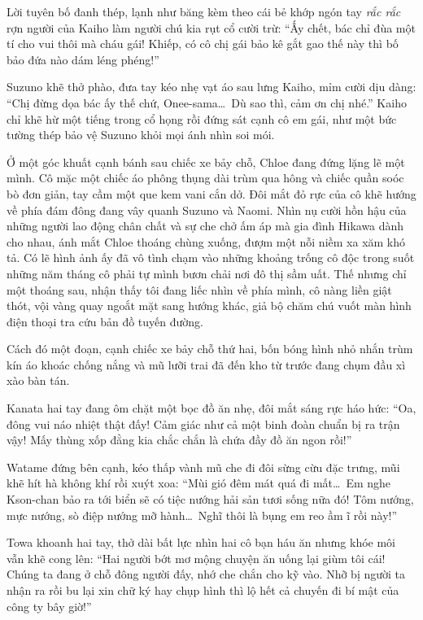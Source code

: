 \documentclass[../main.tex]{subfiles}
\begin{document}
Lời tuyên bố đanh thép, lạnh như băng kèm theo cái bẻ khớp ngón tay \textit{rắc rắc} rợn người của Kaiho làm người chú kia rụt cổ cười trừ: ``Ấy chết, bác chỉ đùa một tí cho vui thôi mà cháu gái! Khiếp, có cô chị gái bảo kê gắt gao thế này thì bố bảo đứa nào dám léng phéng!''

Suzuno khẽ thở phào, đưa tay kéo nhẹ vạt áo sau lưng Kaiho, mỉm cười dịu dàng: ``Chị đừng dọa bác ấy thế chứ, Onee-sama\dots\ Dù sao thì, cảm ơn chị nhé.'' Kaiho chỉ khẽ hừ một tiếng trong cổ họng rồi đứng sát cạnh cô em gái, như một bức tường thép bảo vệ Suzuno khỏi mọi ánh nhìn soi mói.

Ở một góc khuất cạnh bánh sau chiếc xe bảy chỗ, Chloe đang đứng lặng lẽ một mình. Cô mặc một chiếc áo phông thụng dài trùm qua hông và chiếc quần soóc bò đơn giản, tay cầm một que kem vani cắn dở. Đôi mắt đỏ rực của cô khẽ hướng về phía đám đông đang vây quanh Suzuno và Naomi. Nhìn nụ cười hồn hậu của những người lao động chân chất và sự che chở ấm áp mà gia đình Hikawa dành cho nhau, ánh mắt Chloe thoáng chùng xuống, đượm một nỗi niềm xa xăm khó tả. Có lẽ hình ảnh ấy đã vô tình chạm vào những khoảng trống cô độc trong suốt những năm tháng cô phải tự mình bươn chải nơi đô thị sầm uất. Thế nhưng chỉ một thoáng sau, nhận thấy tôi đang liếc nhìn về phía mình, cô nàng liền giật thót, vội vàng quay ngoắt mặt sang hướng khác, giả bộ chăm chú vuốt màn hình điện thoại tra cứu bản đồ tuyến đường.

Cách đó một đoạn, cạnh chiếc xe bảy chỗ thứ hai, bốn bóng hình nhỏ nhắn trùm kín áo khoác chống nắng và mũ lưỡi trai đã đến kho từ trước đang chụm đầu xì xào bàn tán.

Kanata hai tay đang ôm chặt một bọc đồ ăn nhẹ, đôi mắt sáng rực háo hức: ``Oa, đông vui náo nhiệt thật đấy! Cảm giác như cả một binh đoàn chuẩn bị ra trận vậy! Mấy thùng xốp đằng kia chắc chắn là chứa đầy đồ ăn ngon rồi!''

Watame đứng bên cạnh, kéo thấp vành mũ che đi đôi sừng cừu đặc trưng, mũi khẽ hít hà không khí rồi xuýt xoa: ``Mùi gió đêm mát quá đi mất\dots\ Em nghe Kson-chan bảo ra tới biển sẽ có tiệc nướng hải sản tươi sống nữa đó! Tôm nướng, mực nướng, sò điệp nướng mỡ hành\dots\ Nghĩ thôi là bụng em reo ầm ĩ rồi này!''

Towa khoanh hai tay, thở dài bất lực nhìn hai cô bạn háu ăn nhưng khóe môi vẫn khẽ cong lên: ``Hai người bớt mơ mộng chuyện ăn uống lại giùm tôi cái! Chúng ta đang ở chỗ đông người đấy, nhớ che chắn cho kỹ vào. Nhỡ bị người ta nhận ra rồi bu lại xin chữ ký hay chụp hình thì lộ hết cả chuyến đi bí mật của công ty bây giờ!''
\end{document}
